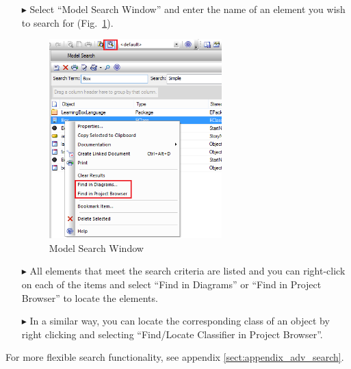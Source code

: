 \begin{enumerate}
\item[$\blacktriangleright$]Select ``Model Search Window'' and enter the name of an element you wish to search for (Fig.~\ref{fig_search01}). 
\begin{figure}[htbp]
\begin{center}
  \includegraphics[width=0.63\textwidth]{pics/tricks/search/search1}
  \caption{Model Search Window}  
  \label{fig_search01}
\end{center}
\end{figure}

\item[$\blacktriangleright$]
All elements that meet the search criteria are listed and you can right-click on each of the items and select ``Find in Diagrams'' or  ``Find in Project Browser'' to locate the elements. 

\item[$\blacktriangleright$]
In a similar way, you can locate the corresponding class of an object by right clicking and selecting ``Find/Locate Classifier in Project Browser''.
\end{enumerate}

For more flexible search functionality, see appendix \ref{sect:appendix_adv_search}.

